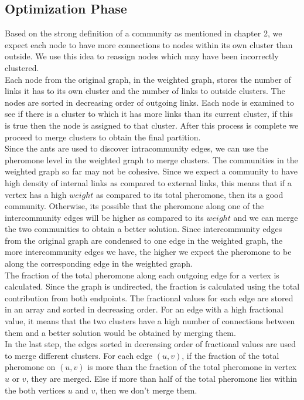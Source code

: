 \begin{spacing}{1.5}
\section{Optimization Phase}

Based on the strong definition of a community as mentioned in chapter 2, we expect each node to have more connections to nodes within its own cluster than outside. We use this idea to reassign nodes which may have been incorrectly clustered.\\
\indent Each node from the original graph, in the weighted graph, stores the number of links it has to its own cluster and the number of links to outside clusters. The nodes are sorted in decreasing order of outgoing links. Each node is examined to see if there is a cluster to which it has more links than its current cluster, if this is true then the node is assigned to that cluster. After this process is complete we proceed to merge clusters to obtain the final partition.\\
\indent Since the ants are used to discover intracommunity edges, we can use the pheromone level in the weighted graph to merge clusters. The communities in the weighted graph so far may not be cohesive. Since we expect a community to have high density of internal links as compared to external links, this means that if a vertex has a high $weight$ as compared to its total pheromone, then its a good community. Otherwise, its possible that the pheromone along one of the intercommunity edges will be higher as compared to its $weight$ and we can merge the two communities to obtain a better solution. Since intercommunity edges from the original graph are condensed to one edge in the weighted graph, the more intercommunity edges we have, the higher we expect the pheromone to be along the corresponding edge in the weighted graph.\\
\indent The fraction of the total pheromone along each outgoing edge for a vertex is calculated. Since the graph is undirected, the fraction is calculated using the total contribution from both endpoints. The fractional values for each edge are stored in an array and sorted in decreasing order. For an edge with a high fractional value, it means that the two clusters have a high number of connections between them and a better solution would be obtained by merging them.\\
\indent In the last step, the edges sorted in decreasing order of fractional values are used to merge different clusters. For each edge $(u, v)$, if the fraction of the total pheromone on $(u,v)$ is more than the fraction of the total pheromone in vertex $u$ or $v$, they are merged. Else if more than half of the total pheromone lies within the both vertices $u$ and $v$, then we don't merge them.\\


\end{spacing}
